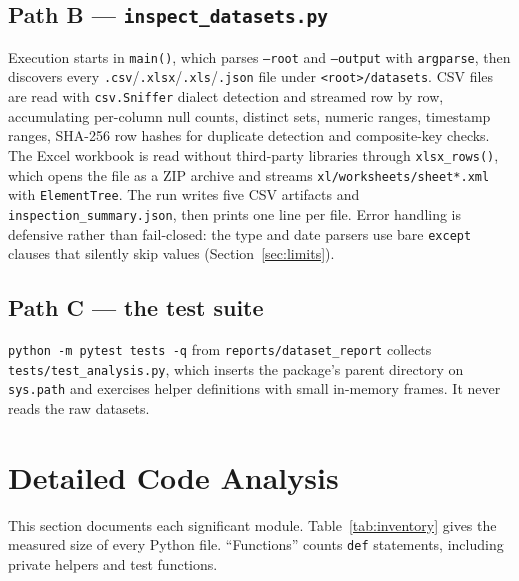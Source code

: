 \documentclass[11pt,a4paper]{article}
\newcommand{\code}[1]{\texttt{#1}}
\begin{document}
\subsection{Path B --- \code{inspect\_datasets.py}}
Execution starts in \code{main()}, which parses \code{--root} and \code{--output} with \code{argparse}, then discovers every \code{.csv}/\code{.xlsx}/\code{.xls}/\code{.json} file under \code{<root>/datasets}. CSV files are read with \code{csv.Sniffer} dialect detection and streamed row by row, accumulating per-column null counts, distinct sets, numeric ranges, timestamp ranges, SHA-256 row hashes for duplicate detection and composite-key checks. The Excel workbook is read without third-party libraries through \code{xlsx\_rows()}, which opens the file as a ZIP archive and streams \code{xl/worksheets/sheet*.xml} with \code{ElementTree}. The run writes five CSV artifacts and \code{inspection\_summary.json}, then prints one line per file. Error handling is defensive rather than fail-closed: the type and date parsers use bare \code{except} clauses that silently skip values (Section~\ref{sec:limits}).

\subsection{Path C --- the test suite}
\code{python -m pytest tests -q} from \code{reports/dataset\_report} collects \code{tests/test\_analysis.py}, which inserts the package's parent directory on \code{sys.path} and exercises helper definitions with small in-memory frames. It never reads the raw datasets.

\section{Detailed Code Analysis}
\label{sec:code}
This section documents each significant module. Table~\ref{tab:inventory} gives the measured size of every Python file. ``Functions'' counts \code{def} statements, including private helpers and test functions.
\end{document}
